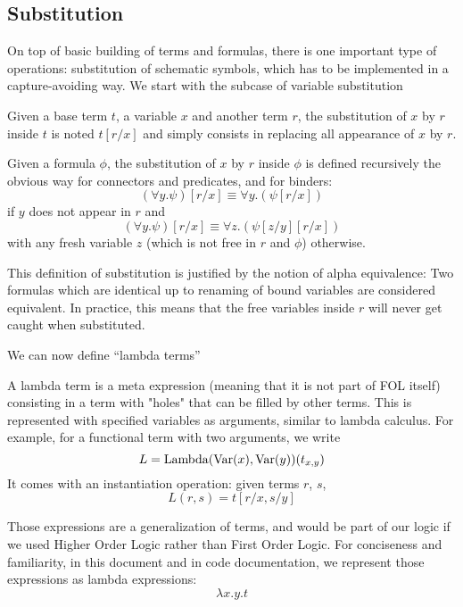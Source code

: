 \subsection{Substitution}
\label{subs:substitution}
On top of basic building of terms and formulas, there is one important type of operations: substitution of schematic symbols, which has to be implemented in a capture-avoiding way. We start with the subcase of variable substitution
\begin{defin}
Given a base term $t$, a variable $x$ and another term $r$, the substitution of $x$ by $r$ inside $t$ is noted $ t[r/x] $ and simply consists in replacing all appearance of $x$ by $r$.

Given a formula $\phi$, the substitution of $x$ by $r$ inside $\phi$ is defined recursively the obvious way for connectors and predicates, and for binders:
$$
(\forall y. \psi)[r/x] \equiv \forall y. (\psi[r/x])
$$
if $y$ does not appear in $r$ and
$$
(\forall y. \psi)[r/x] \equiv \forall z. (\psi[z/y][r/x])
$$
with any fresh variable $z$ (which is not free in $r$ and $\phi$) otherwise.
\end{defin}
This definition of substitution is justified by the notion of alpha equivalence: Two formulas which are identical up to renaming of bound variables are considered equivalent. In practice, this means that the free variables inside $r$ will never get caught when substituted.

We can now define \enquote{lambda terms}
\begin{defin}
A lambda term is a  meta expression (meaning that it is not part of FOL itself) consisting in a term with "holes" that can be filled by other terms. This is represented with specified variables as arguments, similar to lambda calculus. For example, for a functional term with two arguments, we write
$$
L = \operatorname{Lambda}(\operatorname{Var}(x), \operatorname{Var}(y))(t_{x,y})
$$
It comes with an instantiation operation: given terms $r$, $s$,
$$L(r, s) = t[r/x, s/y]$$
\end{defin}
Those expressions are a generalization of terms, and would be part of our logic if we used Higher Order Logic rather than First Order Logic. For conciseness and familiarity, in this document and in code documentation, we represent those expressions as lambda expressions:
$$
\lambda x.y. t
$$

